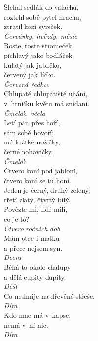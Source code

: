 \begin{multicols}{\value{columnsthindata}}
\noindent
Šlehal sedlák do valachů,\\
roztrhl sobě pytel hrachu,\\
ztratil kozí syreček.\\[1 mm]
{\sl Červánky, hvězdy, měsíc}\\

\noindent
Roste, roste stromeček,\\
pichlavý jako bodláček,\\
kulatý jak jablíčko,\\
červený jak líčko.\\[1 mm]
{\sl Červená ředkev}\\

\noindent
Chlupaté chlupatiště uhání,\\
v~hrníčku květu má snídani.\\[1 mm]
{\sl Čmelák, včela}\\

\noindent
Letí pán přes boří,\\
sám sobě hovoří;\\
má krátké nožičky,\\
černé nohavičky.\\[1 mm]
{\sl Čmelák}\\

\noindent
Čtvero koní pod jabloní,\\
čtvero koní se tu honí.\\
Jeden je černý, druhý zelený,\\
třetí zlatý, čtvrtý bílý.\\
Povězte mi, lidé milí,\\
co je to?\\[1 mm]
{\sl Čtvero ročních dob}\\

\noindent
Mám otce i matku\\
a přece nejsem syn.\\[1 mm]
{\sl Dcera}\\

\noindent
Běhá to okolo chalupy\\
a dělá cupity dupity.\\[1 mm]
{\sl Déšť}\\

\noindent
Co neshnije na dřevěné střeše.\\[1 mm]
{\sl Díra}\\

\noindent
Kdo mne má v~kapse,\\
nemá v~ní nic.\\[1 mm]
{\sl Díra}\\


\end{multicols}
